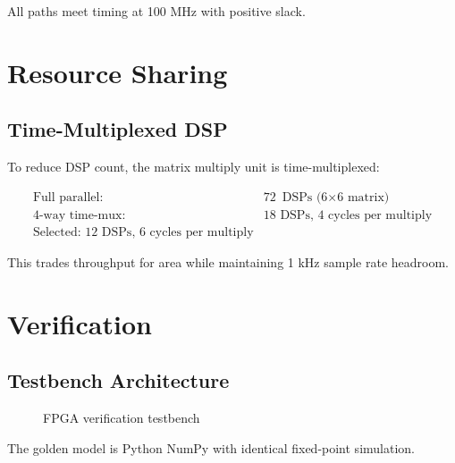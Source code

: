 All paths meet timing at 100 MHz with positive slack.

\section{Resource Sharing}

\subsection{Time-Multiplexed DSP}

To reduce DSP count, the matrix multiply unit is time-multiplexed:

\begin{align}
    \text{Full parallel: } & 72 \text{ DSPs (6$\times$6 matrix)} \\
    \text{4-way time-mux: } & 18 \text{ DSPs, 4 cycles per multiply} \\
    \text{Selected: 12 DSPs, 6 cycles per multiply}
\end{align}

This trades throughput for area while maintaining 1 kHz sample rate headroom.

\section{Verification}

\subsection{Testbench Architecture}

\begin{figure}[h]
    \centering
    \caption{FPGA verification testbench}
    \label{fig:fpga_tb}
\end{figure}

The golden model is Python NumPy with identical fixed-point simulation.

